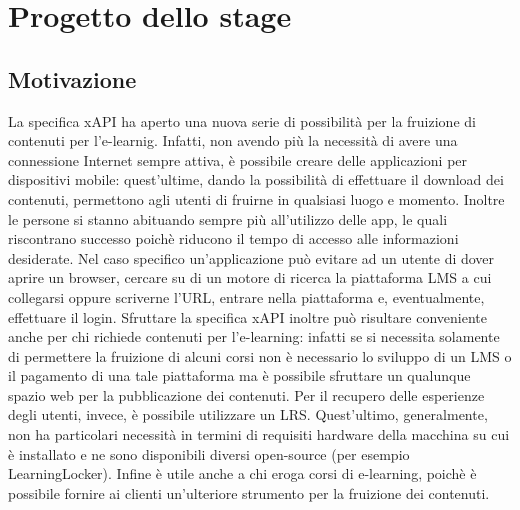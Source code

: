 \documentclass[../Tesi.tex]{subfiles}
\begin{document}
\section{Progetto dello stage}
	\subsection{Motivazione}
	La specifica xAPI ha aperto una nuova serie di possibilità per la fruizione di contenuti per l'e-learnig. Infatti, non avendo più la necessità di avere una connessione Internet sempre attiva, è possibile creare delle applicazioni per dispositivi mobile: quest'ultime, dando la possibilità di effettuare il download dei contenuti, permettono agli utenti di fruirne in qualsiasi luogo e momento. Inoltre le persone si stanno abituando sempre più all'utilizzo delle app, le quali riscontrano successo poichè riducono il tempo di accesso alle informazioni desiderate. Nel caso specifico un'applicazione può evitare ad un utente di dover aprire un browser, cercare su di un motore di ricerca la piattaforma LMS a cui collegarsi oppure scriverne l'URL, entrare nella piattaforma e, eventualmente, effettuare il login. Sfruttare la specifica xAPI inoltre può risultare conveniente anche per chi richiede contenuti per l’e-learning: infatti se si necessita solamente di permettere la fruizione di alcuni corsi non è necessario lo sviluppo di un LMS o il pagamento di una tale piattaforma ma è possibile sfruttare un qualunque spazio web per la pubblicazione dei contenuti. Per il recupero delle esperienze degli utenti, invece, è possibile utilizzare un LRS. Quest'ultimo, generalmente, non ha particolari necessità in termini di requisiti hardware della macchina su cui è installato e ne sono disponibili diversi open-source (per esempio LearningLocker). Infine è utile anche a chi eroga corsi di e-learning, poichè è possibile fornire ai clienti un’ulteriore strumento per la fruizione dei contenuti.
\end{document}
